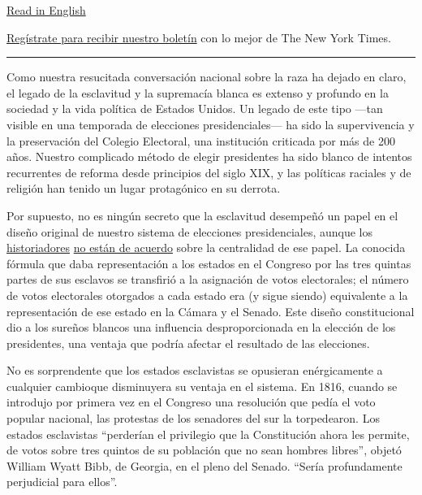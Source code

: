 \href{https://www.nytimes3xbfgragh.onion/2020/08/03/opinion/electoral-college-racism-white-supremacy.html}{Read
in English}

\href{https://www.nytimes3xbfgragh.onion/newsletters/el-times}{Regístrate
para recibir nuestro boletín} con lo mejor de The New York Times.

\begin{center}\rule{0.5\linewidth}{\linethickness}\end{center}

Como nuestra resucitada conversación nacional sobre la raza ha dejado en
claro, el legado de la esclavitud y la supremacía blanca es extenso y
profundo en la sociedad y la vida política de Estados Unidos. Un legado
de este tipo ---tan visible en una temporada de elecciones
presidenciales--- ha sido la supervivencia y la preservación del Colegio
Electoral, una institución criticada por más de 200 años. Nuestro
complicado método de elegir presidentes ha sido blanco de intentos
recurrentes de reforma desde principios del siglo XIX, y las políticas
raciales y de religión han tenido un lugar protagónico en su derrota.

Por supuesto, no es ningún secreto que la esclavitud desempeñó un papel
en el diseño original de nuestro sistema de elecciones presidenciales,
aunque los
\href{https://www.nytimes3xbfgragh.onion/2019/04/04/opinion/the-electoral-college-slavery-myth.html?action=click\&module=RelatedLinks\&pgtype=Article}{historiadores}
\href{https://www.nytimes3xbfgragh.onion/2019/04/06/opinion/electoral-college-slavery.html}{no
están de acuerdo} sobre la centralidad de ese papel. La conocida fórmula
que daba representación a los estados en el Congreso por las tres
quintas partes de sus esclavos se transfirió a la asignación de votos
electorales; el número de votos electorales otorgados a cada estado era
(y sigue siendo) equivalente a la representación de ese estado en la
Cámara y el Senado. Este diseño constitucional dio a los sureños blancos
una influencia desproporcionada en la elección de los presidentes, una
ventaja que podría afectar el resultado de las elecciones.

No es sorprendente que los estados esclavistas se opusieran
enérgicamente a cualquier cambioque disminuyera su ventaja en el
sistema. En 1816, cuando se introdujo por primera vez en el Congreso una
resolución que pedía el voto popular nacional, las protestas de los
senadores del sur la torpedearon. Los estados esclavistas ``perderían el
privilegio que la Constitución ahora les permite, de votos sobre tres
quintos de su población que no sean hombres libres'', objetó William
Wyatt Bibb, de Georgia, en el pleno del Senado. ``Sería profundamente
perjudicial para ellos''.

